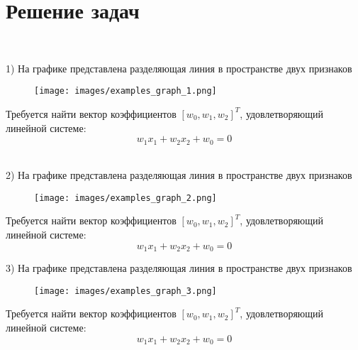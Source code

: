 \section*{\Huge \centering \textbf{Решение задач}} \\
\vspace{1.1cm}

1) На графике представлена разделяющая линия в пространстве двух признаков

\begin{figure}[htbp]
        \centering
        \texttt{[image: images/examples\_graph\_1.png]}
        \label{fig:example}
\end{figure}
Требуется найти вектор коэффициентов \([w_0, w_1, w_2]^T\), удовлетворяющий линейной системе: \\
\[w_1 x_1 + w_2 x_2 + w_0 = 0\] \\
\vspace{1cm}

2) На графике представлена разделяющая линия в пространстве двух признаков

\begin{figure}[htbp]
        \centering
        \texttt{[image: images/examples\_graph\_2.png]}
        \label{fig:example}
\end{figure}
Требуется найти вектор коэффициентов \([w_0, w_1, w_2]^T\), удовлетворяющий линейной системе: \\
\[w_1 x_1 + w_2 x_2 + w_0 = 0\]
\vspace{1cm}

3) На графике представлена разделяющая линия в пространстве двух признаков

\begin{figure}[htbp]
        \centering
        \texttt{[image: images/examples\_graph\_3.png]}
        \label{fig:example}
\end{figure}
Требуется найти вектор коэффициентов \([w_0, w_1, w_2]^T\), удовлетворяющий линейной системе: \\
\[w_1 x_1 + w_2 x_2 + w_0 = 0\]
\vspace{1cm}





